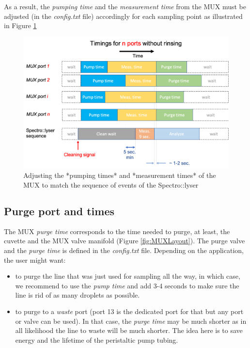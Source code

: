 \documentclass[]{book}
\providecommand{\tightlist}{%
  \setlength{\itemsep}{0pt}\setlength{\parskip}{0pt}}
\begin{document}
As a result, the \emph{pumping time} and the \emph{measurement time} from the MUX must be adjusted (in the \emph{config.txt} file) accordingly for each sampling point as illustrated in Figure \ref{fig:TimingsSeveralPorts}

\begin{figure}

{\centering \includegraphics[width=0.8\linewidth]{pictures/TimingsSeveralPorts} 

}

\caption{Adjusting the *pumping times* and *measurement times* of the MUX to match the sequence of events of the Spectro::lyser}\label{fig:TimingsSeveralPorts}
\end{figure}

\hypertarget{purge-port-and-times}{%
\subsection{Purge port and times}\label{purge-port-and-times}}

The MUX \emph{purge time} corresponds to the time needed to purge, at least, the cuvette and the MUX valve manifold (Figure \ref{fig:MUXLayout}). The purge valve and the \emph{purge time} is defined in the \emph{config.txt} file. Depending on the application, the user might want:

\begin{itemize}
\tightlist
\item
  to purge the line that was just used for sampling all the way, in which case, we recommend to use the \emph{pump time} and add 3-4 seconds to make sure the line is rid of as many droplets as possible.
\item
  to purge to a \emph{waste} port (port 13 is the dedicated port for that but any port or valve can be used). In that case, the \emph{purge time} may be much shorter as in all likelihood the line to waste will be much shorter. The idea here is to save energy and the lifetime of the peristaltic pump tubing.
\end{itemize}
\end{document}
